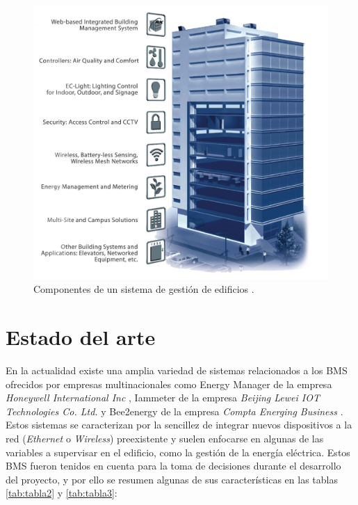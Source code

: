 \vspace{1cm}
\begin{figure}[htbp]
\centering
\includegraphics[width=.95\textwidth]{./Figures/bms4.jpg}
\caption{Componentes de un sistema de gestión de edificios \protect\footnotemark .}
\label{fig:bms}
\end{figure}



\section{Estado del arte}
En la actualidad existe una amplia variedad de sistemas relacionados a los BMS ofrecidos por empresas multinacionales como Energy Manager de la empresa \emph{Honeywell International Inc} \citep{WEBSITE:35}, Iammeter de la empresa \emph{Beijing Lewei IOT Technologies Co. Ltd.} \citep{WEBSITE:36} y Bee2energy de la empresa \emph{Compta Energing Business} \citep{WEBSITE:37}. Estos sistemas se caracterizan por la sencillez de integrar nuevos dispositivos a la red (\emph{Ethernet} o \emph{Wireless}) preexistente y suelen enfocarse en algunas de las variables a supervisar en el edificio, como la gestión de la energía eléctrica. Estos BMS fueron tenidos en cuenta para la toma de decisiones durante el desarrollo del proyecto, y por ello se resumen algunas de sus características en las tablas \ref{tab:tabla2} y \ref{tab:tabla3}:


